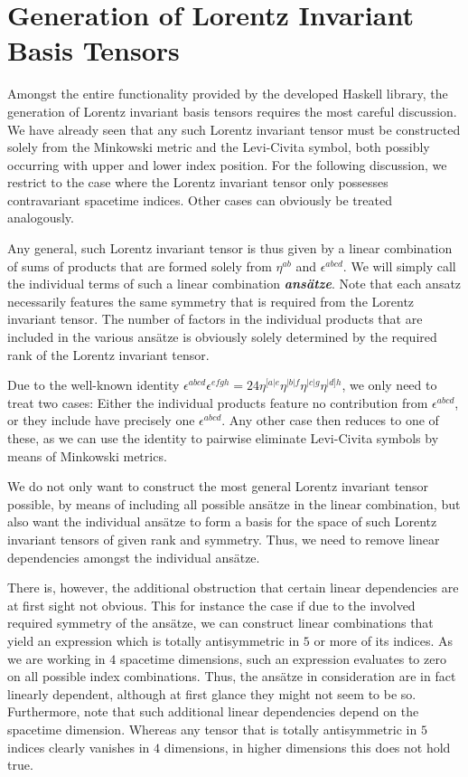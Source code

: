 \section{Generation of Lorentz Invariant Basis Tensors}\label{LorentzGen}
Amongst the entire functionality provided by the developed Haskell library, the generation of Lorentz invariant basis tensors requires the most careful discussion. We have already seen that any such Lorentz invariant tensor must be constructed solely from the Minkowski metric and the Levi-Civita symbol, both possibly occurring with upper and lower index position. For the following discussion, we restrict to the case where the Lorentz invariant tensor only possesses contravariant spacetime indices. Other cases can obviously be treated analogously.

Any general, such Lorentz invariant tensor is thus given by a linear combination of sums of products that are formed solely from $\eta^{ab}$ and $\epsilon^{abcd}$.
We will simply call the individual terms of such a linear combination \textit{\textbf{ansätze}}. Note that each ansatz necessarily features the same symmetry that is required from the Lorentz invariant tensor. The number of factors in the individual products that are included in the various ansätze is obviously solely determined by the required rank of the Lorentz invariant tensor.

Due to the well-known identity $\epsilon^{abcd}\epsilon^{efgh} = 24 \eta^{[a\vert e}\eta^{\vert b \vert f}\eta^{\vert c \vert g}\eta^{\vert d] h}$, we only need to treat two cases: Either the individual products feature  no contribution from $\epsilon^{abcd}$, or they include have precisely one $\epsilon^{abcd}$. Any other case then reduces to one of these, as we can use the identity to pairwise eliminate Levi-Civita symbols by means of Minkowski metrics. 

We do not only want to construct the most general Lorentz invariant tensor possible, by means of including all possible ansätze in the linear combination, but also want the individual ansätze to form a basis for the space of such Lorentz invariant tensors of given rank and symmetry. Thus, we need to remove linear dependencies amongst the individual ansätze. 

There is, however, the additional obstruction that certain linear dependencies are at first sight not obvious. This for instance the case if due to the involved required symmetry of the ansätze, we can construct linear combinations that yield an expression which is totally antisymmetric in $5$ or more of its indices. As we are working in $4$ spacetime dimensions, such an expression evaluates to zero on all possible index combinations. Thus, the ansätze in consideration are in fact linearly dependent, although at first glance they might not seem to be so. 
Furthermore, note that such additional linear dependencies depend on the spacetime dimension. Whereas any tensor that is totally antisymmetric in $5$ indices clearly vanishes in $4$ dimensions, in higher dimensions this does not hold true.  

